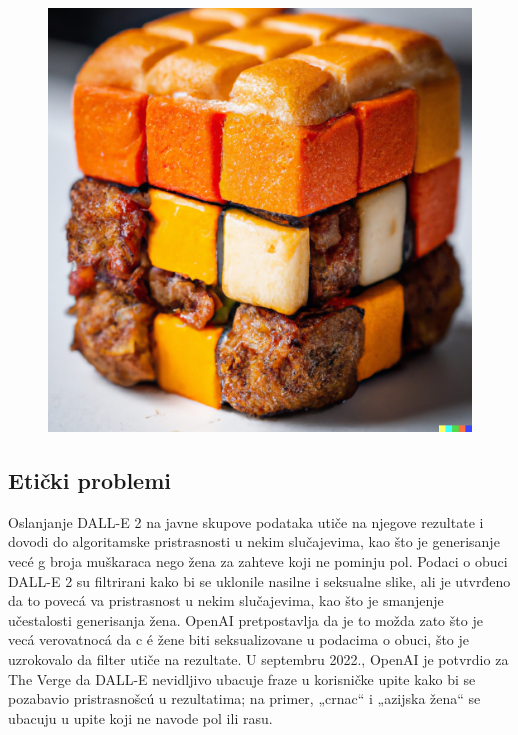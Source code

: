 \documentclass[a4paper]{article}
\begin{document}
\begin{figure}[h!]
\begin{center}
\includegraphics[scale=0.10]{hamburger.jpg}
\end{center}
\label{fig:hamburger}
\end{figure}
\newpage
\subsection{Etički problemi}
\label{subsec: Etički problemi}
Oslanjanje DALL-E 2 na javne skupove podataka utiče na njegove rezultate i dovodi do algoritamske pristrasnosti u nekim slučajevima, kao što je generisanje vecé g broja muškaraca nego žena za zahteve koji ne pominju pol. Podaci o obuci DALL-E 2 su filtrirani kako bi se uklonile nasilne i seksualne slike, ali je utvrđeno da to povecá va pristrasnost u nekim slučajevima, kao što je smanjenje učestalosti generisanja žena. OpenAI pretpostavlja da je to možda zato što je vecá verovatnocá da c é žene biti seksualizovane u podacima o obuci, što je uzrokovalo da filter utiče na rezultate. U septembru 2022., OpenAI je potvrdio za The Verge da DALL-E nevidljivo ubacuje fraze u korisničke upite kako bi se pozabavio pristrasnošcú u rezultatima; na primer, „crnac“ i „azijska žena“ se ubacuju u upite koji ne navode pol ili rasu.
\end{document}
